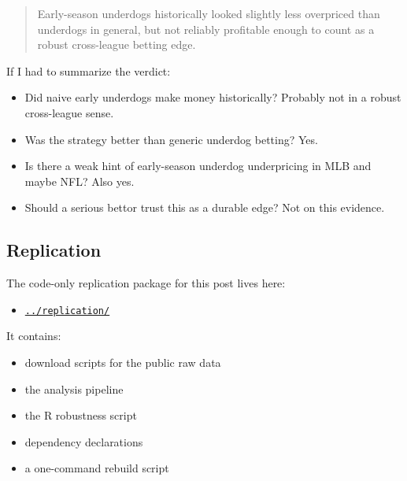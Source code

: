 \documentclass[
  letterpaper,
  DIV=11,
  numbers=noendperiod]{scrartcl}
\providecommand{\tightlist}{%
  \setlength{\itemsep}{0pt}\setlength{\parskip}{0pt}}\usepackage{longtable,booktabs,array}
\begin{document}
\begin{quote}
Early-season underdogs historically looked slightly less overpriced than
underdogs in general, but not reliably profitable enough to count as a
robust cross-league betting edge.
\end{quote}

If I had to summarize the verdict:

\begin{itemize}
\tightlist
\item
  Did naive early underdogs make money historically? Probably not in a
  robust cross-league sense.
\item
  Was the strategy better than generic underdog betting? Yes.
\item
  Is there a weak hint of early-season underdog underpricing in MLB and
  maybe NFL? Also yes.
\item
  Should a serious bettor trust this as a durable edge? Not on this
  evidence.
\end{itemize}

\subsection{Replication}\label{replication}

The code-only replication package for this post lives here:

\begin{itemize}
\tightlist
\item
  \href{../replication/}{\texttt{../replication/}}
\end{itemize}

It contains:

\begin{itemize}
\tightlist
\item
  download scripts for the public raw data
\item
  the analysis pipeline
\item
  the R robustness script
\item
  dependency declarations
\item
  a one-command rebuild script
\end{itemize}
\end{document}

